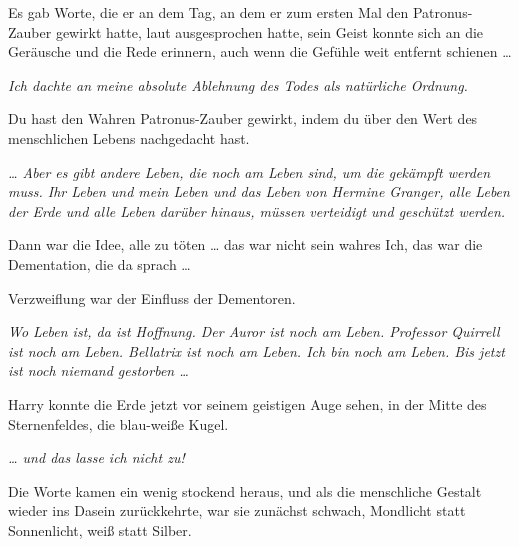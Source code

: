 Es gab Worte, die er an dem Tag, an dem er zum ersten Mal den Patronus-Zauber gewirkt hatte, laut ausgesprochen hatte, sein Geist konnte sich an die Geräusche und die Rede erinnern, auch wenn die Gefühle weit entfernt schienen …

\emph{Ich dachte an meine absolute Ablehnung des Todes als natürliche Ordnung.}

Du hast den Wahren Patronus-Zauber gewirkt, indem du über den Wert des menschlichen Lebens nachgedacht hast.

\emph{… Aber es gibt andere Leben, die noch am Leben sind, um die gekämpft werden muss. Ihr Leben und mein Leben und das Leben von Hermine Granger, alle Leben der Erde und alle Leben darüber hinaus, müssen verteidigt und geschützt werden.}

Dann war die Idee, alle zu töten … das war nicht sein wahres Ich, das war die Dementation, die da sprach …

Verzweiflung war der Einfluss der Dementoren.

\emph{Wo Leben ist, da ist Hoffnung. Der Auror ist noch am Leben. Professor Quirrell ist noch am Leben. Bellatrix ist noch am Leben. Ich bin noch am Leben. Bis jetzt ist noch niemand gestorben …}

Harry konnte die Erde jetzt vor seinem geistigen Auge sehen, in der Mitte des Sternenfeldes, die blau-weiße Kugel.

\emph{… und das lasse ich nicht zu!}


Die Worte kamen ein wenig stockend heraus, und als die menschliche Gestalt wieder ins Dasein zurückkehrte, war sie zunächst schwach, Mondlicht statt Sonnenlicht, weiß statt Silber.

